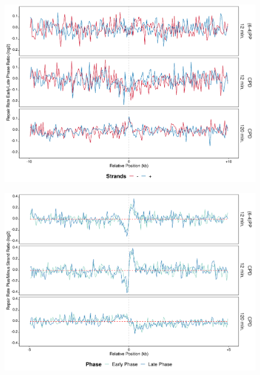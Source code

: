 \begin{figure}[H]
\begin{center}
\includegraphics[width=\textwidth]{Chapters/7_appendix/figures/supfig57}
\caption[]{}
\label{supfig:}
\end{center}
\end{figure}

\begin{figure}[H]
\begin{center}
\includegraphics[width=\textwidth]{Chapters/7_appendix/figures/supfig58}
\caption[]{}
\label{supfig:}
\end{center}
\end{figure}

